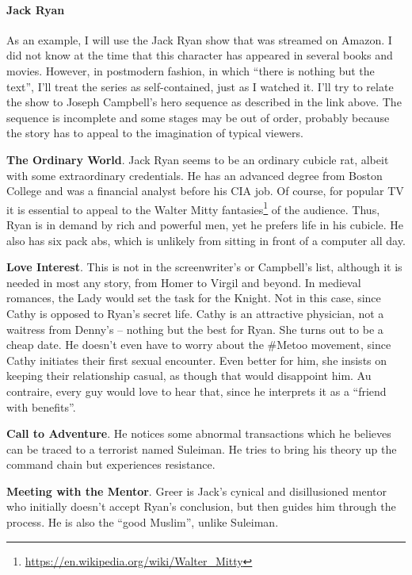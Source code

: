 \paragraph{Jack Ryan}


As an example, I will use the Jack Ryan show that was streamed on Amazon. I did not know at the time that this character has appeared in several books and movies. However, in postmodern fashion, in which ``there is nothing but the text'', I'll treat the series as self-contained, just as I watched it. I'll try to relate the show to Joseph Campbell's hero sequence as described in the link above. The sequence is incomplete and some stages may be out of order, probably because the story has to appeal to the imagination of typical viewers.

\textbf{The Ordinary World}. Jack Ryan seems to be an ordinary cubicle rat, albeit with some extraordinary credentials. He has an advanced degree from Boston College and was a financial analyst before his CIA job. Of course, for popular TV it is essential to appeal to the Walter Mitty fantasies\footnote{\url{https://en.wikipedia.org/wiki/Walter\_Mitty}} of the audience. Thus, Ryan is in demand by rich and powerful men, yet he prefers life in his cubicle. He also has six pack abs, which is unlikely from sitting in front of a computer all day.

\textbf{Love Interest}. This is not in the screenwriter's or Campbell's list, although it is needed in most any story, from Homer to Virgil and beyond. In medieval romances, the Lady would set the task for the Knight. Not in this case, since Cathy is opposed to Ryan's secret life. Cathy is an attractive physician, not a waitress from Denny's -- nothing but the best for Ryan. She turns out to be a cheap date. He doesn't even have to worry about the \#Metoo movement, since Cathy initiates their first sexual encounter. Even better for him, she insists on keeping their relationship casual, as though that would disappoint him. Au contraire, every guy would love to hear that, since he interprets it as a ``friend with benefits''.

\textbf{Call to Adventure}. He notices some abnormal transactions which he believes can be traced to a terrorist named Suleiman. He tries to bring his theory up the command chain but experiences resistance.

\textbf{Meeting with the Mentor}. Greer is Jack's cynical and disillusioned mentor who initially doesn't accept Ryan's conclusion, but then guides him through the process. He is also the ``good Muslim'', unlike Suleiman.

